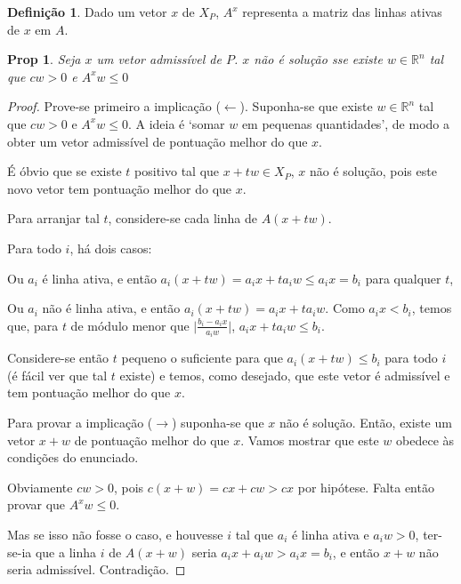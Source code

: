 \documentclass{article}
\newcommand{\R}{\mathbb{R}}
\newtheorem{prop}{Prop}
\theoremstyle{definition}
\newtheorem{definition}{Definição}
\begin{document}
	\begin{definition}
	Dado um vetor $x$ de $X_P$, $A^x$ representa a matriz das linhas ativas de $x$ em $A$.
	\end{definition}
	
	
	\begin{prop} \label{linhasativas1}
	Seja $x$ um vetor admissível de $P$. $x$ não é solução sse existe $w \in \R^n$ tal que $cw > 0$ e $A^x w \leq 0$
	\end{prop}
	
	\begin{proof}
	Prove-se primeiro a implicação ($\leftarrow$). Suponha-se que existe $w \in \R^n$ tal que $cw > 0$ e $A^x w \leq 0$. A ideia é `somar $w$ em pequenas quantidades', de modo a obter um vetor admissível de pontuação melhor do que $x$.
	
	É óbvio que se existe $t$ positivo tal que $x + tw \in X_P$, $x$ não é solução, pois este novo vetor tem pontuação melhor do que $x$.
	
	Para arranjar tal $t$, considere-se cada linha de $A(x + tw)$.
	
	Para todo $i$, há dois casos:
	
	Ou $a_i$ é linha ativa, e então $a_i (x + tw) = a_i x + t a_i w \leq a_i x = b_i$ para qualquer $t$,
	
	Ou $a_i$ não é linha ativa, e então $a_i (x + t w) = a_i x + t a_i w$. Como $a_i x < b_i$, temos que, para $t$ de módulo menor que $\lvert \frac{b_i - a_i x}{a_i w} \rvert$, $a_i x + t a_i w \leq b_i$.
	
	Considere-se então $t$ pequeno o suficiente para que $a_i (x + t w) \leq b_i$ para todo $i$ (é fácil ver que tal $t$ existe) e temos, como desejado, que este vetor é admissível e tem pontuação melhor do que $x$.
	
	Para provar a implicação ($\rightarrow$) suponha-se que $x$ não é solução. Então, existe um vetor $x+w$ de pontuação melhor do que $x$. Vamos mostrar que este $w$ obedece às condições do enunciado.
	
	Obviamente $cw > 0$, pois $c(x+w) = cx + cw > cx$ por hipótese. Falta então provar que $A^x w \leq 0$.
	
	Mas se isso não fosse o caso, e houvesse $i$ tal que $a_i$ é linha ativa e $a_i w > 0$, ter-se-ia que a linha $i$ de $A(x+w)$ seria $a_i x + a_i w > a_i x  = b_i$, e então $x+w$ não seria admissível. Contradição.
	\end{proof}
	
\end{document}
